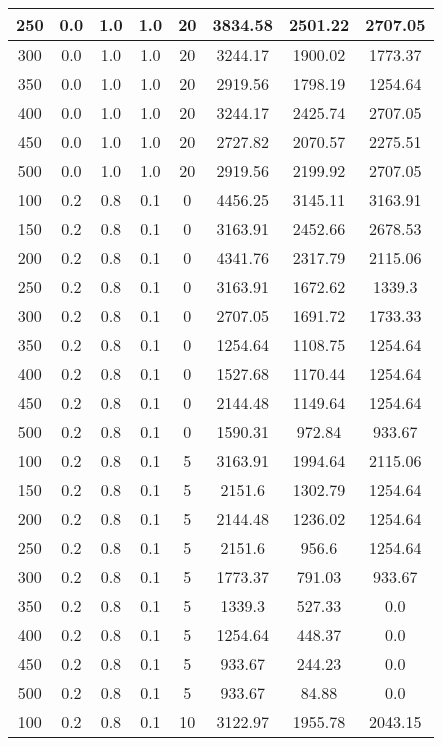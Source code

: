 \documentclass[a4paper, 12pt]{extreport}
\begin{document}
\begin{itemize}
\begin{longtable}{|c|c|c|c|c|c|c|c|}
			250 & 0.0 & 1.0 & 1.0 & 20 & 3834.58 & 2501.22 & 2707.05 \\\hline
			300 & 0.0 & 1.0 & 1.0 & 20 & 3244.17 & 1900.02 & 1773.37 \\\hline
			350 & 0.0 & 1.0 & 1.0 & 20 & 2919.56 & 1798.19 & 1254.64 \\\hline
			400 & 0.0 & 1.0 & 1.0 & 20 & 3244.17 & 2425.74 & 2707.05 \\\hline
			450 & 0.0 & 1.0 & 1.0 & 20 & 2727.82 & 2070.57 & 2275.51 \\\hline
			500 & 0.0 & 1.0 & 1.0 & 20 & 2919.56 & 2199.92 & 2707.05 \\\hline
			100 & 0.2 & 0.8 & 0.1 & 0 & 4456.25 & 3145.11 & 3163.91 \\\hline
			150 & 0.2 & 0.8 & 0.1 & 0 & 3163.91 & 2452.66 & 2678.53 \\\hline
			200 & 0.2 & 0.8 & 0.1 & 0 & 4341.76 & 2317.79 & 2115.06 \\\hline
			250 & 0.2 & 0.8 & 0.1 & 0 & 3163.91 & 1672.62 & 1339.3 \\\hline
			300 & 0.2 & 0.8 & 0.1 & 0 & 2707.05 & 1691.72 & 1733.33 \\\hline
			350 & 0.2 & 0.8 & 0.1 & 0 & 1254.64 & 1108.75 & 1254.64 \\\hline
			400 & 0.2 & 0.8 & 0.1 & 0 & 1527.68 & 1170.44 & 1254.64 \\\hline
			450 & 0.2 & 0.8 & 0.1 & 0 & 2144.48 & 1149.64 & 1254.64 \\\hline
			500 & 0.2 & 0.8 & 0.1 & 0 & 1590.31 & 972.84 & 933.67 \\\hline
			100 & 0.2 & 0.8 & 0.1 & 5 & 3163.91 & 1994.64 & 2115.06 \\\hline
			150 & 0.2 & 0.8 & 0.1 & 5 & 2151.6 & 1302.79 & 1254.64 \\\hline
			200 & 0.2 & 0.8 & 0.1 & 5 & 2144.48 & 1236.02 & 1254.64 \\\hline
			250 & 0.2 & 0.8 & 0.1 & 5 & 2151.6 & 956.6 & 1254.64 \\\hline
			300 & 0.2 & 0.8 & 0.1 & 5 & 1773.37 & 791.03 & 933.67 \\\hline
			350 & 0.2 & 0.8 & 0.1 & 5 & 1339.3 & 527.33 & 0.0 \\\hline
			400 & 0.2 & 0.8 & 0.1 & 5 & 1254.64 & 448.37 & 0.0 \\\hline
			450 & 0.2 & 0.8 & 0.1 & 5 & 933.67 & 244.23 & 0.0 \\\hline
			500 & 0.2 & 0.8 & 0.1 & 5 & 933.67 & 84.88 & 0.0 \\\hline
			100 & 0.2 & 0.8 & 0.1 & 10 & 3122.97 & 1955.78 & 2043.15 \\\hline

\end{longtable}
\end{itemize}
\end{document}
